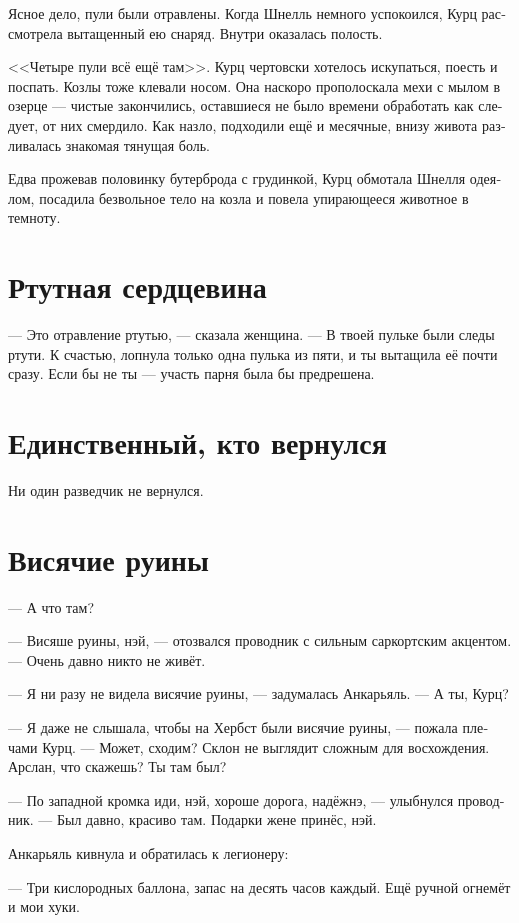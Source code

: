 \documentclass[a4paper,10pt,fleqn]{book}\usepackage{polyglossia}\setdefaultlanguage[babelshorthands=true]{russian}\setotherlanguage{english}\defaultfontfeatures{Ligatures=TeX,Mapping=tex-text}\usepackage{xcolor}\newcommand{\ml}[3]{#2}
\begin{document}
Ясное дело, пули были отравлены.
Когда Шнелль немного успокоился, Курц рассмотрела вытащенный ею снаряд.
Внутри оказалась полость.

<<Четыре пули всё ещё там>>.
Курц чертовски хотелось искупаться, поесть и поспать.
Козлы тоже клевали носом.
Она наскоро прополоскала мехи с мылом в озерце --- чистые закончились, оставшиеся не было времени обработать как следует, от них смердило.
Как назло, подходили ещё и месячные, внизу живота разливалась знакомая тянущая боль.

Едва прожевав половинку бутерброда с грудинкой, Курц обмотала Шнелля одеялом, посадила безвольное тело на козла и повела упирающееся животное в темноту.

\section{Ртутная сердцевина}

--- Это отравление ртутью, --- сказала женщина.
--- В твоей пульке были следы ртути.
К счастью, лопнула только одна пулька из пяти, и ты вытащила её почти сразу.
Если бы не ты --- участь парня была бы предрешена.

\section{Единственный, кто вернулся}

Ни один разведчик не вернулся.

\section{Висячие руины}

--- А что там?

--- Висяше руины, нэй, --- отозвался проводник с сильным саркортским акцентом.
--- Очень давно никто не живёт.

--- Я ни разу не видела висячие руины, --- задумалась Анкарьяль.
--- А ты, Курц?

--- Я даже не слышала, чтобы на Хербст были висячие руины, --- пожала плечами Курц.
--- Может, сходим?
Склон не выглядит сложным для восхождения.
Арслан, что скажешь?
Ты там был?

--- По западной кромка иди, нэй, хороше дорога, надёжнэ, --- улыбнулся проводник.
--- Был давно, красиво там.
Подарки жене принёс, нэй.

Анкарьяль кивнула и обратилась к легионеру:

--- Три кислородных баллона, запас на десять часов каждый.
Ещё ручной огнемёт и мои хуки.
\end{document}
